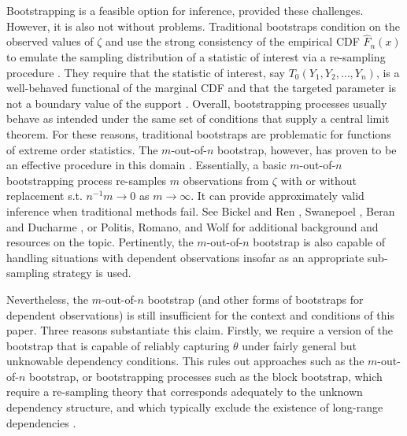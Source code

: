 \documentclass[12pt]{amsart}
\theoremstyle{plain}%
\theoremstyle{definition}
\theoremstyle{remark}
\numberwithin{equation}{section}
\begin{document}
Bootstrapping is a feasible option for inference, provided these challenges. However, it is also not without problems. Traditional bootstraps condition on the observed values of $\zeta$ and use the strong consistency of the empirical CDF $\hat{F}_n(x)$ to emulate the sampling distribution of a statistic of interest via a re-sampling procedure \cite{efron1994introduction}. They require that the statistic of interest, say $T_0(Y_1, Y_2, \ldots, Y_n)$, is a well-behaved functional of the marginal CDF and that the targeted parameter is not a boundary value of the support \cite{bickel1981some}. Overall, bootstrapping processes usually behave as intended under the same set of conditions that supply a central limit theorem. For these reasons, traditional bootstraps are problematic for functions of extreme order statistics. The $m$-out-of-$n$ bootstrap, however, has proven to be an effective procedure in this domain \cite{bickel2008choice}.  Essentially, a basic $m$-out-of-$n$ bootstrapping process re-samples $m$ observations from $\zeta$ with or without replacement s.t. $n^{-1}m\to 0$ as $m \to \infty$. It can provide approximately valid inference when traditional methods fail. See Bickel and Ren \cite{bickel2001bootstrap}, Swanepoel \cite{swanepoel1986note}, Beran and Ducharme \cite{beran1991asympotic}, or Politis, Romano, and Wolf \cite{politis2001asymptotic} for additional background and resources on the topic. Pertinently, the $m$-out-of-$n$ bootstrap is also capable of handling situations with dependent observations insofar as an appropriate sub-sampling strategy is used.

Nevertheless, the $m$-out-of-$n$ bootstrap (and other forms of bootstraps for dependent observations) is still insufficient for the context and conditions of this paper. Three reasons substantiate this claim. Firstly, we require a version of the bootstrap that is capable of reliably capturing $\theta$ under fairly general but unknowable dependency conditions. This rules out approaches such as the $m$-out-of-$n$ bootstrap, or bootstrapping processes such as the block bootstrap, which require a re-sampling theory that corresponds adequately to the unknown dependency structure, and which typically exclude the existence of long-range dependencies \cite{ shao2010dependent, hall1995blocking, kreiss2011bootstrap, lahiri2003resampling}. 
\end{document}
